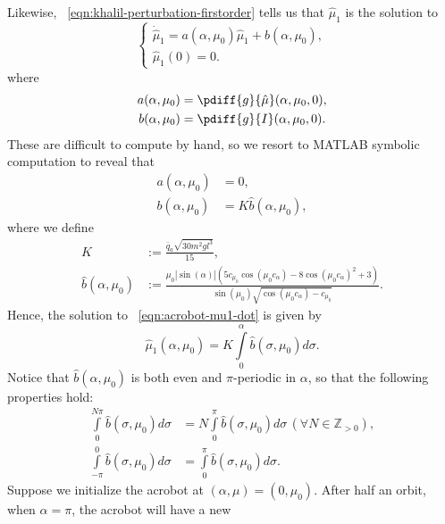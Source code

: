 Likewise, ~\eqref{eqn:khalil-perturbation-firstorder} tells us that 
\(\hat{\mu}_1\) is the solution to
\begin{equation}\label{eqn:acrobot-mu1-dot}
    \begin{cases}
        \dot{\hat{\mu}}_1 = a(\alpha,\mu_0)\hat{\mu}_1 + b(\alpha,\mu_0)
        , \\
        \hat{\mu}_1(0) = 0
        .
    \end{cases}
\end{equation}
where
\begin{align*}
    a(\alpha,\mu_0) &= \pdiff{g}{\hat{\mu}}(\alpha,\mu_0,0)
    , \\
    b(\alpha, \mu_0) &= \pdiff{g}{I}(\alpha, \mu_0, 0)
    .
\end{align*}
These are difficult to compute by hand, so we resort to MATLAB symbolic
computation to reveal that
\begin{align*}
    a(\alpha,\mu_0) &= 0
    , \\
    b(\alpha,\mu_0) &= K \hat{b}(\alpha,\mu_0)
    ,
\end{align*}
where we define
\begin{align*}
    K &:= \frac{\bar{q}_a \sqrt{30m^2g l^3}}{15}
    , \\
    \hat{b}(\alpha,\mu_0) &:= \frac{
        \mu_0 |\sin(\alpha)| \left(
        5 c_{\mu_0} \cos(\mu_0 c_\alpha) - 8 \cos(\mu_0c_\alpha)^2 + 3
    \right)
    }{
    \sin(\mu_0)\sqrt{\cos(\mu_0c_\alpha) - c_{\mu_0}}
    }
    .
\end{align*}
Hence, the solution to ~\eqref{eqn:acrobot-mu1-dot} is given by
\[
    \hat{\mu}_1(\alpha,\mu_0) =
    K \int \limits_0^\alpha \hat{b}(\sigma,\mu_0)d\sigma
    .
\]
Notice that \(\hat{b}(\alpha,\mu_0)\) is both even and 
\(\pi\)-periodic in \(\alpha\), so that the following properties hold:
\begin{equation}\label{eqn:bhat-integral-properties}
    \begin{split}
    \int \limits_0 ^ {N \pi} \hat{b}(\sigma,\mu_0) d\sigma
    &= N \int \limits_0^\pi \hat{b}(\sigma,\mu_0) d\sigma \, 
    \left(\forall N \in \mathbb{Z}_{> 0}\right)
    , \\
    \int \limits_{-\pi}^0 \hat{b}(\sigma,\mu_0) d\sigma
    &= \int \limits_0^\pi \hat{b}(\sigma,\mu_0)d\sigma
    .
    \end{split}
\end{equation}
Suppose we initialize the acrobot at \((\alpha,\mu) = (0,\mu_0)\). 
After half an orbit, when \(\alpha = \pi\), the acrobot will have a new
